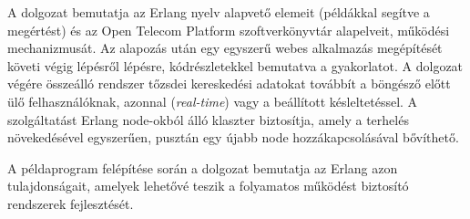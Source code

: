 \documentclass[12pt, a4paper, oneside]{book}
\begin{document}
A dolgozat bemutatja az Erlang nyelv alapvető elemeit (példákkal segítve a
megértést) és az Open Telecom Platform szoftverkönyvtár alapelveit, működési
mechanizmusát. Az alapozás után egy egyszerű webes alkalmazás megépítését
követi végig lépésről lépésre, kódrészletekkel bemutatva a gyakorlatot. A
dolgozat végére összeálló rendszer tőzsdei kereskedési adatokat továbbít a
böngésző előtt ülő felhasználóknak, azonnal (\emph{real-time}) vagy a
beállított késleltetéssel. A szolgáltatást Erlang node-okból álló klaszter
biztosítja, amely a terhelés növekedésével egyszerűen, pusztán egy újabb node
hozzákapcsolásával bővíthető.

A példaprogram felépítése során a dolgozat bemutatja az Erlang azon
tulajdonságait, amelyek lehetővé teszik a folyamatos működést biztosító
rendszerek fejlesztését.
\end{document}

